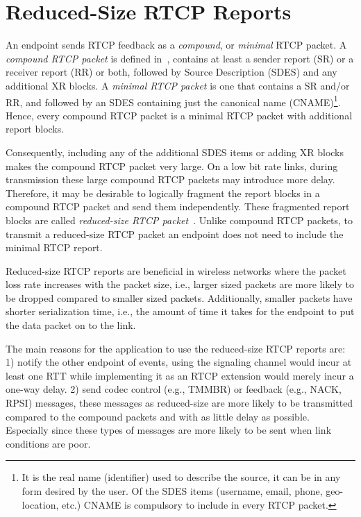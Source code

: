 \section{Reduced-Size RTCP Reports}

An endpoint sends RTCP feedback as a \emph{compound}, or \emph{minimal} RTCP
packet. A \emph{compound RTCP packet} is defined in~\cite{rfc3585}, contains
at least a sender report (SR) or a receiver report (RR) or both, followed by
Source Description (SDES) and any additional XR blocks. A \emph{minimal RTCP
packet} is one that contains a SR and/or RR, and followed by an SDES
containing just the canonical name (CNAME)\footnote{It is the real name
(identifier) used to describe the source, it can be in any form desired by the
user. Of the SDES items (username, email, phone, geo-location, etc.) CNAME is
compulsory to include in every RTCP packet.}. Hence, every compound RTCP
packet is a minimal RTCP packet with additional report blocks.

Consequently, including any of the additional SDES items or adding XR blocks
makes the compound RTCP packet very large. On a low bit rate links, during
transmission these large compound RTCP packets may introduce more delay.
Therefore, it may be desirable to logically fragment the report blocks in a
compound RTCP packet and send them independently. These fragmented report
blocks are called \emph{reduced-size RTCP packet}~\cite{rfc5506}. Unlike
compound RTCP packets, to transmit a reduced-size RTCP packet an endpoint does
not need to include the minimal RTCP report.

Reduced-size RTCP reports are beneficial in wireless networks where the packet
loss rate increases with the packet size, i.e., larger sized packets are more
likely to  be dropped compared to smaller sized packets. Additionally, smaller
packets have shorter serialization time, i.e., the amount of time it takes for
the endpoint to put the data packet on to the link.

The main reasons for the application to use the reduced-size RTCP reports are:
1) notify the other endpoint of events, using the signaling channel would
incur at least one RTT while implementing it as an RTCP extension would merely
incur a one-way delay. 2) send codec control (e.g., TMMBR) or feedback (e.g.,
NACK, RPSI) messages, these messages as reduced-size are more likely to be
transmitted compared to the compound packets and with as little delay as
possible. Especially since these types of messages are more likely to be sent
when link conditions are poor.


